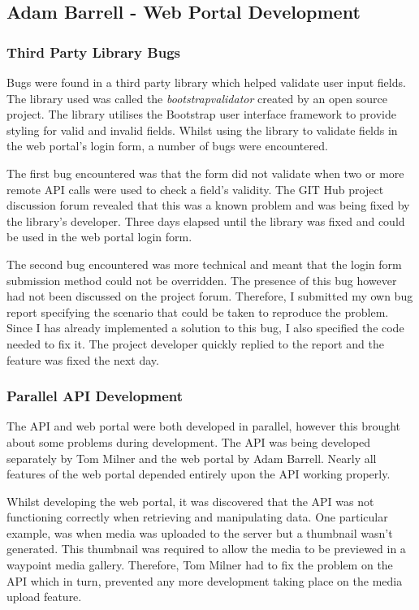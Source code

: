 \documentclass[11pt,a4paper]{report}
\begin{document}
\subsection{Adam Barrell - Web Portal Development}

\subsubsection{Third Party Library Bugs}
Bugs were found in a third party library which helped validate user input fields. The library used was called the \emph{bootstrapvalidator}\cite{bootstrapvalidator} created by an open source project. The library utilises the Bootstrap user interface framework to provide styling for valid and invalid fields. Whilst using the library to validate fields in the web portal's login form, a number of bugs were encountered.

The first bug encountered was that the form did not validate when two or more remote API calls were used to check a field's validity. The GIT Hub project discussion forum revealed that this was a known problem and was being fixed by the library's developer. Three days elapsed until the library was fixed and could be used in the web portal login form.

The second bug encountered was more technical and meant that the login form submission method could not be overridden. The presence of this bug however had not been discussed on the project forum. Therefore, I submitted my own bug report specifying the scenario that could be taken to reproduce the problem. Since I has already implemented a solution to this bug, I also specified the code needed to fix it. The project developer quickly replied to the report and the feature was fixed the next day.

\subsubsection{Parallel API Development}
The API and web portal were both developed in parallel, however this brought about some problems during development. The API was being developed separately by Tom Milner and the web portal by Adam Barrell. Nearly all features of the web portal depended entirely upon the API working properly.

Whilst developing the web portal, it was discovered that the API was not functioning correctly when retrieving and manipulating data. One particular example, was when media was uploaded to the server but a thumbnail wasn't generated. This thumbnail was required to allow the media to be previewed in a waypoint media gallery. Therefore, Tom Milner had to fix the problem on the API which in turn, prevented any more development taking place on the media upload feature.
\end{document}
